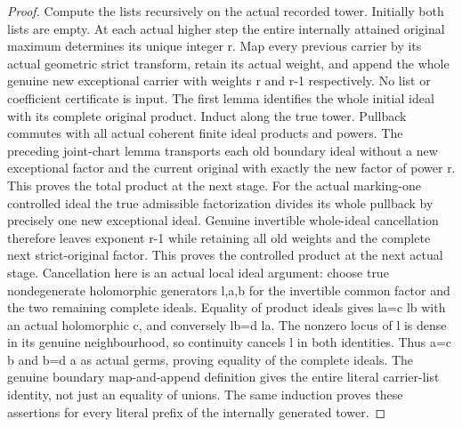 \begin{proof}
Compute the lists recursively on the actual recorded tower. Initially both
lists are empty. At each actual higher step the entire internally attained
original maximum determines its unique integer r. Map every previous carrier
by its actual geometric strict transform, retain its actual weight, and append
the whole genuine new exceptional carrier with weights r and r-1 respectively.
No list or coefficient certificate is input. The first lemma identifies the
whole initial ideal with its complete original product. Induct along the true
tower. Pullback commutes with all actual coherent finite ideal products and
powers. The preceding joint-chart lemma transports each old boundary ideal
without a new exceptional factor and the current original with exactly the
new factor of power r. This proves the total product at the next stage. For
the actual marking-one controlled ideal the true admissible factorization
divides its whole pullback by precisely one new exceptional ideal. Genuine
invertible whole-ideal cancellation therefore leaves exponent r-1 while
retaining all old weights and the complete next strict-original factor. This
proves the controlled product at the next actual stage.
Cancellation here is an actual local ideal argument: choose true nondegenerate
holomorphic generators l,a,b for the invertible common factor and the two
remaining complete ideals. Equality of product ideals gives la=c lb with an
actual holomorphic c, and conversely lb=d la. The nonzero locus of l is dense
in its genuine neighbourhood, so continuity cancels l in both identities.
Thus a=c b and b=d a as actual germs, proving equality of the complete ideals.
The genuine boundary
map-and-append definition gives the entire literal carrier-list identity, not
just an equality of unions. The same induction proves these assertions for
every literal prefix of the internally generated tower.
\end{proof}


